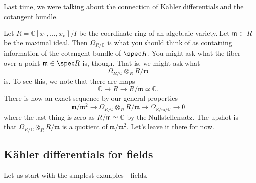 Last time, we were talking about the connection of K\"ahler differentials and
the cotangent bundle.
\begin{example} 
Let $R = \mathbb{C}[x_1, \dots, x_n]/I$ be the coordinate ring of an algebraic
variety. Let $\mathfrak{m} \subset R$ be the maximal ideal. Then 
$\Omega_{R/\mathbb{C}}$ is what you should think of as containing information
of the cotangent bundle of $\spec R$. You might ask what the fiber over a point
$\mathfrak{m} \in \spec R$ is, though. That is, we might ask what
\[ \Omega_{R/\mathbb{C}} \otimes_R R/\mathfrak{m}  \]
is. To see this, we note that there are maps
\[ \mathbb{C} \to R \to R/\mathfrak{m} \simeq \mathbb{C}.  \]
There is now an exact sequence by our general properties
\[ \mathfrak{m}/\mathfrak{m}^2 \to \Omega_{R/\mathbb{C}} \otimes_R
R/\mathfrak{m} \to \Omega_{\mathbb{R}/\mathfrak{m}/\mathbb{C}} \to 0  \]
where the last thing is zero as $R/\mathfrak{m} \simeq \mathbb{C} $ by the
Nullstellensatz.
The upshot is that $\Omega_{R/\mathbb{C}} \otimes_R R/\mathfrak{m}$ is a
quotient of $\mathfrak{m}/\mathfrak{m}^2$. Let's leave it there for now.
\end{example} 

\subsection{K\"ahler differentials for fields}

Let us start with the simplest examples---fields.

